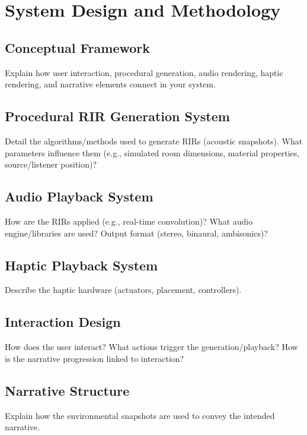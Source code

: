 \chapter{System Design and Methodology}
    \section{Conceptual Framework} Explain how user interaction, procedural generation, audio rendering, haptic rendering, and narrative elements connect in your system.
    \section{Procedural RIR Generation System} Detail the algorithms/methods used to generate RIRs (acoustic snapshots). What parameters influence them (e.g., simulated room dimensions, material properties, source/listener position)?
    \section{Audio Playback System} How are the RIRs applied (e.g., real-time convolution)? What audio engine/libraries are used? Output format (stereo, binaural, ambisonics)?
    \section{Haptic Playback System} Describe the haptic hardware (actuators, placement, controllers). 
    \section{Interaction Design} How does the user interact? What actions trigger the generation/playback? How is the narrative progression linked to interaction?
    \section{Narrative Structure} Explain how the environmental snapshots are used to convey the intended narrative.